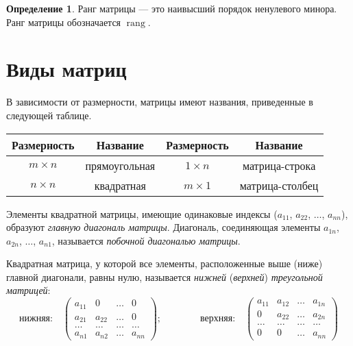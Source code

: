 \documentclass[a5paper, 11pt]{extbook}
\theoremstyle{definition}
\theoremstyle{definition}
\newtheorem{definition}{Определение}[section]
\theoremstyle{definition}
\DeclareMathOperator{\rang}{rang}
\begin{document}
\begin{definition}
    Ранг матрицы — это наивысший порядок ненулевого минора. Ранг матрицы обозначается \(\rang\).
\end{definition}

\section{Виды матриц}
\label{sec:orgbc2a2b4}
В зависимости от размерности, матрицы имеют названия, приведенные в следующей таблице.
\begin{center}
    \begin{tabular}{|c|c|c|c|}
        Размерность    & Название      & Размерность    & Название        \\
        \hline
        \(m \times n\) & прямоугольная & \(1 \times n\) & матрица-строка  \\
        \(n \times n\) & квадратная    & \(m \times 1\) & матрица-столбец \\
    \end{tabular}
\end{center}

Элементы квадратной матрицы, имеющие одинаковые индексы (\(a_{11}\), \(a_{22}\), \(\ldots\), \(a_{nn}\)), образуют \emph{главную диагональ матрицы}. Диагональ, соединяющая элементы \(a_{1n}\), \(a_{2n}\), \(\ldots\), \(a_{n1}\), называется \emph{побочной диагональю матрицы}.

Квадратная матрица, у которой все элементы, расположенные выше (ниже) главной диагонали, равны нулю, называется \emph{нижней} (\emph{верхней}) \emph{треугольной матрицей}:
\begin{equation*}
    \text{нижняя:}
    \quad
    \begin{pmatrix}
        a_{11} & 0      & \ldots & 0      \\
        a_{21} & a_{22} & \ldots & 0      \\
        \ldots & \ldots & \ldots & \ldots \\
        a_{n1} & a_{n2} & \ldots & a_{nn}
    \end{pmatrix};
    \qquad \qquad
    \text{верхняя:}
    \quad
    \begin{pmatrix}
        a_{11} & a_{12} & \ldots & a_{1n} \\
        0      & a_{22} & \ldots & a_{2n} \\
        \ldots & \ldots & \ldots & \ldots \\
        0      & 0      & \ldots & a_{nn}
    \end{pmatrix}
\end{equation*}
\end{document}
